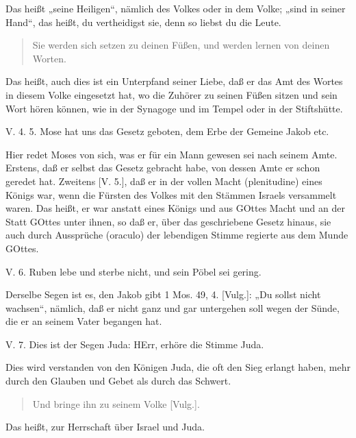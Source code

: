 Das heißt „seine Heiligen“, nämlich des Volkes oder in dem Volke; „sind in seiner Hand“, das heißt, du vertheidigst sie, denn so liebst du die Leute.

\begin{quote}
Sie werden sich setzen zu deinen Füßen, und werden lernen von deinen Worten.
\end{quote}

Das heißt, auch dies ist ein Unterpfand seiner Liebe, daß er das Amt des Wortes in diesem Volke eingesetzt hat, wo die Zuhörer zu seinen Füßen sitzen und sein Wort hören können, wie in der Synagoge und im Tempel oder in der Stiftshütte.

\begin{schriftzitat}
V. 4. 5. Mose hat uns das Gesetz geboten, dem Erbe der Gemeine Jakob etc.
\end{schriftzitat}

Hier redet Moses von sich, was er für ein Mann gewesen sei nach seinem Amte. Erstens, daß er selbst das Gesetz gebracht habe, von dessen Amte er schon geredet hat. Zweitens [V. 5.], daß er in der vollen Macht (plenitudine) eines Königs war, wenn die Fürsten des Volkes mit den Stämmen Israels versammelt waren. Das heißt, er war anstatt eines Königs und aus GOttes Macht und an der Statt GOttes unter ihnen, so daß er, über das geschriebene Gesetz hinaus, sie auch durch Aussprüche (oraculo) der lebendigen Stimme regierte aus dem Munde GOttes.

\begin{schriftzitat}
V. 6. Ruben lebe und sterbe nicht, und sein Pöbel sei gering.
\end{schriftzitat}

Derselbe Segen ist es, den Jakob gibt 1 Mos. 49, 4. [Vulg.]: „Du sollst nicht wachsen“, nämlich, daß er nicht ganz und gar untergehen soll wegen der Sünde, die er an seinem Vater begangen hat.

\begin{schriftzitat}
V. 7. Dies ist der Segen Juda: HErr, erhöre die Stimme Juda.
\end{schriftzitat}

Dies wird verstanden von den Königen Juda, die oft den Sieg erlangt haben, mehr durch den Glauben und Gebet als durch das Schwert.

\begin{quote}
Und bringe ihn zu seinem Volke [Vulg.].
\end{quote}

Das heißt, zur Herrschaft über Israel und Juda.

